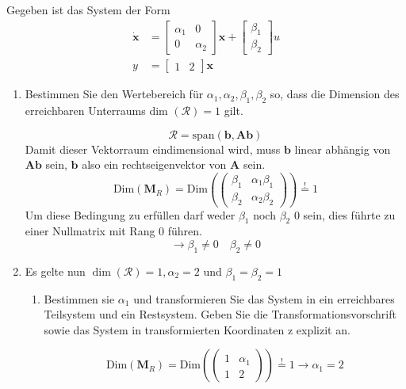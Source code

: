 \documentclass[crop=false]{standalone}
\begin{document}
\begin{task}
Gegeben ist das System der Form
\[ 
\begin{aligned} \dot{\mathbf{x}} &=\left[\begin{array}{cc}{\alpha_{1}} & {0} \\ {0} & {\alpha_{2}}\end{array}\right] \mathbf{x}+\left[\begin{array}{c}{\beta_{1}} \\ {\beta_{2}}\end{array}\right] u \\ y &=\left[\begin{array}{ll}{1} & {2}\end{array}\right] \mathbf{x} \end{aligned}
 \]
 \begin{enumerate}[i]
     \item Bestimmen Sie den Wertebereich für $\alpha_{1}, \alpha_{2}, \beta_{1}, \beta_{2}$ so, dass die Dimension des erreichbaren Unterraums dim $(\mathcal{R})=1$ gilt.
     \begin{solution}
     \[ \mathcal{R} = \text{span}\left(\mathbf{b},\mathbf{Ab}\right)\]
     Damit dieser Vektorraum eindimensional wird, muss $\mathbf{b}$ linear abhängig von $\mathbf{Ab}$ sein, $\mathbf{b}$ also ein rechtseigenvektor von $\mathbf{A}$ sein.
     \[\text{Dim}\left(\mathbf{M}_R\right)=
     \text{Dim}\left(
     \begin{pmatrix}
     \beta_1 & \alpha_1 \beta_1 \\
     \beta_2 & \alpha_2 \beta_2
     \end{pmatrix}
     \right)
     \stackrel{!}{=} 1
     \]
     Um diese Bedingung zu erfüllen darf weder $\beta_1$ noch $\beta_2$ 0 sein, dies führte zu einer Nullmatrix mit Rang 0 führen.
     \[\rightarrow \beta_1 \neq 0 \quad \beta_2 \neq 0\]
     \end{solution}
     \item Es gelte nun $\operatorname{dim}(\mathcal{R})=1, \alpha_{2}=2$ und $\beta_{1}=\beta_{2}=1$
     \begin{enumerate}[A]
         \item Bestimmen sie $\alpha_{1}$ und transformieren Sie das System in ein erreichbares Teilsystem und ein Restsystem. Geben Sie die Transformationsvorschrift sowie
das System in transformierten Koordinaten z explizit an.
\begin{solution}
\[\text{Dim}\left(\mathbf{M}_R\right)=
     \text{Dim}\left(
     \begin{pmatrix}
     1 & \alpha_1 \\
     1 & 2
     \end{pmatrix}
     \right)
     \stackrel{!}{=} 1 \rightarrow \alpha_1 = 2
     \]
     

\end{solution}
\end{enumerate}
\end{enumerate}
\end{task}
\end{document}
